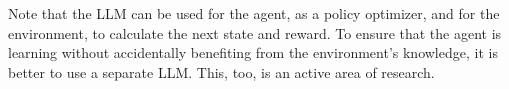 Note that the LLM can be used for the agent, as a policy optimizer, and for the environment, to calculate the next state and reward. To ensure that the agent is learning without accidentally benefiting from the environment's knowledge, it is better to use a separate LLM. This, too, is an active area of research.

